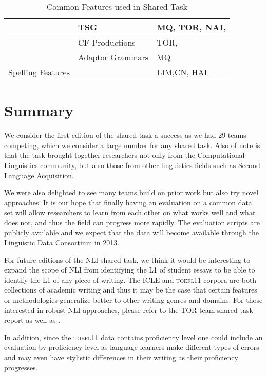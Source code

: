 \documentclass[11pt,letterpaper]{article}
\begin{document}
\begin{table*}[!ht]
\begin{center}
\begin{small}
\begin{tabular}{|l|l|p{9.5cm}|}
                   & TSG                 & MQ, TOR, NAI,  \\ \hline
                   & CF Productions      & TOR, \\ \hline
		   & Adaptor Grammars  & MQ  \\ \hline
Spelling Features  &        &   LIM,CN, HAI \\ \hline
\end{tabular}
\end{small}
\caption{Common Features used in Shared Task\label{tab:common-features}}
\end{center}
\end{table*}


\section{Summary}
\label{sec-summary}
We consider the first edition of the shared task a success as we had
29 teams competing, which we consider a large number for any
shared task.  Also of note is that the task brought together
researchers not only from the Computational Linguistics community,
but also those from other linguistics fields such as Second
Language Acquisition.

We were also delighted to see many teams build on
prior work but also try novel approaches.  It is our hope that
finally having an evaluation on a common data set
will allow researchers to learn from each
other on what works well and what does not, and thus the
field can progress more rapidly.  The evaluation scripts are
publicly available and we expect that the data will become
available through the Linguistic Data Consortium in 2013.

For future editions of the NLI shared task, we think it would be
interesting to expand the scope of NLI from identifying the L1
of student essays to be able to identify the L1 of any piece of
writing.  The ICLE and \textsc{toefl11} corpora are both
collections of academic writing and thus it may be the case that
certain features or methodologies generalize better to other
writing genres and domains.  For those interested in robust
NLI approaches, please refer to the TOR team shared task report
as well as .

In addition, since the \textsc{toefl11} data contains proficiency level
one could include an evaluation by
proficiency level
as language learners make different types of errors
and may even have stylistic differences in their writing as their
proficiency progresses.
\end{document}
